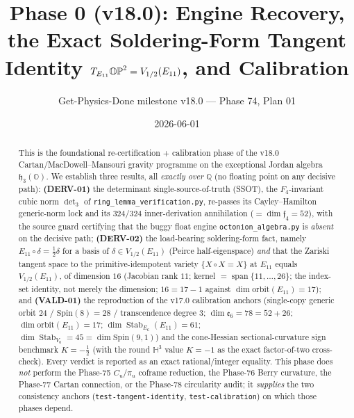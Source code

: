 \documentclass[11pt]{article}
\title{Phase 0 (v18.0): Engine Recovery, the Exact Soldering-Form Tangent
Identity $T_{\Eoneone}\OP=\Vhalf(\Eoneone)$, and Calibration}
\author{Get-Physics-Done milestone v18.0 --- Phase 74, Plan 01}
\date{2026-06-01}
\newcommand{\hO}{\mathfrak{h}_3(\mathbb{O})}
\newcommand{\Eoneone}{E_{11}}
\newcommand{\Vhalf}{V_{1/2}}
\newcommand{\Stab}{\operatorname{Stab}}
\newcommand{\jord}{\circ}
\newcommand{\fr}{\mathfrak{f}_4}
\newcommand{\er}{\mathfrak{e}_6}
\begin{document}
\maketitle

\begin{abstract}
This is the foundational re-certification + calibration phase of the v18.0
Cartan/MacDowell--Mansouri gravity programme on the exceptional Jordan algebra
$\hO$. We establish three results, all \emph{exactly over $\mathbb{Q}$} (no
floating point on any decisive path):
\textbf{(DERV-01)} the determinant single-source-of-truth (SSOT), the
$F_4$-invariant cubic norm $\det_3$ of \texttt{ring\_lemma\_verification.py},
re-passes its Cayley--Hamilton generic-norm lock and its $324/324$
inner-derivation annihilation ($=\dim\fr=52$), with the source guard certifying
that the buggy float engine \texttt{octonion\_algebra.py} is \emph{absent} on the
decisive path;
\textbf{(DERV-02)} the load-bearing soldering-form fact, namely $\Eoneone\jord
\delta=\tfrac12\delta$ for a basis of $\delta\in\Vhalf(\Eoneone)$ (Peirce
half-eigenspace) \emph{and} that the Zariski tangent space to the
primitive-idempotent variety $\{X\jord X=X\}$ at $\Eoneone$ equals
$\Vhalf(\Eoneone)$, of dimension $16$ (Jacobian rank $11$; kernel
$=\operatorname{span}\{11,\dots,26\}$; the index-set identity, not merely the
dimension; $16=17-1$ against $\dim\mathrm{orbit}(\Eoneone)=17$); and
\textbf{(VALD-01)} the reproduction of the v17.0 calibration anchors
(single-copy generic orbit $24$ / $\mathrm{Spin}(8)=28$ / transcendence degree
$3$; $\dim\er=78=52+26$; $\dim\mathrm{orbit}(\Eoneone)=17$;
$\dim\Stab_{E_6}(\Eoneone)=61$; $\dim\Stab_{V_0}=45=\dim\mathrm{Spin}(9,1)$) and
the cone-Hessian sectional-curvature sign benchmark $K=-\tfrac12$ (with the round
$\mathbb{H}^3$ value $K=-1$ as the exact factor-of-two cross-check). Every
verdict is reported as an exact rational/integer equality. This phase does
\emph{not} perform the Phase-75 $C_u/\pi_u$ coframe reduction, the Phase-76 Berry
curvature, the Phase-77 Cartan connection, or the Phase-78 circularity audit; it
\emph{supplies} the two consistency anchors (\texttt{test-tangent-identity},
\texttt{test-calibration}) on which those phases depend.
\end{abstract}
\end{document}
